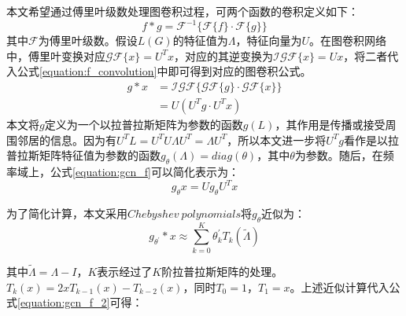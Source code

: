 本文希望通过傅里叶级数处理图卷积过程，可两个函数的卷积定义如下：
\begin{equation}
    f*g = \mathcal{F}^{-1}\{\mathcal{F}\{f\} \cdot \mathcal{F} \{ g \} \}
    \label{equation:f_convolution}
\end{equation}
其中$\mathcal{F}$为傅里叶级数。假设$L(G)$的特征值为$\Lambda$，特征向量为$U$。在图卷积网络中，傅里叶变换对应$\mathcal{G}\mathcal{F}\{x\} = U^Tx$，对应的其逆变换为$\mathcal{I}\mathcal{G}\mathcal{F}\{x\} = Ux$，将二者代入公式\ref{equation:f_convolution}中即可得到对应的图卷积公式。
\begin{equation}
    \begin{aligned}
        g * x &= \mathcal{I}\mathcal{G}\mathcal{F}\{ \mathcal{G}\mathcal{F}\{g\} \cdot \mathcal{G}\mathcal{F}\{x\} \} \\
        &=U(U^Tg \cdot U^Tx) 
    \end{aligned}
    \label{equation:gcn_f}
\end{equation}
本文将$g$定义为一个以拉普拉斯矩阵为参数的函数$g(L)$，其作用是传播或接受周围邻居的信息。因为有$U^T L = U^T U \Lambda U^T = \Lambda U^T$，所以本文进一步将$U^T g$看作是以拉普拉斯矩阵特征值为参数的函数$g_\theta(\Lambda) = diag(\theta)$，其中$\theta$为参数。随后，在频率域上，公式\ref{equation:gcn_f}可以简化表示为：
\begin{equation}
    g_\theta x= Ug_\theta U^T x
    \label{equation:gcn_f_2}
\end{equation}

为了简化计算，本文采用$Chebyshev \ polynomials$将$g_\theta$近似为：
\begin{equation}
    g_{\theta^{\prime}} * x \approx \sum_{k=0}^{K} \theta^{\prime}_k T_k (\widetilde{\Lambda})  
    \label{equation:g_approx}
\end{equation}

其中$\widetilde{\Lambda} = \Lambda - I$，$K$表示经过了$K$阶拉普拉斯矩阵的处理。$T_k(x) = 2xT_{k-1}(x) - T_{k-2}(x)$，同时$T_0 = 1$，$T_1 = x$。上述近似计算代入公式\ref{equation:gcn_f_2}可得：

